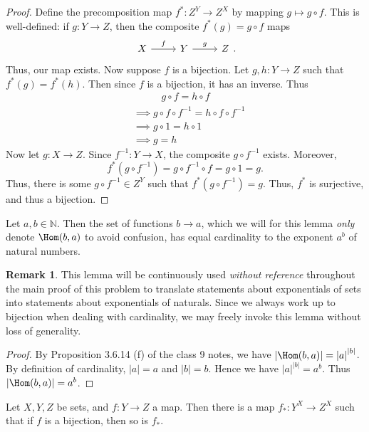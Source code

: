 \documentclass[11pt, letterpaper]{article}
\theoremstyle{definition}
\newtheorem*{remark*}{Remark}
\begin{document}
\begin{proof}
	Define the precomposition map $f^* : Z^Y \to Z^X$ by mapping $g\mapsto g\circ f$. This is well-defined: if $g : Y \to Z$, then the composite $f^*(g) = g\circ f$ maps
	\[
		\begin{tikzcd}[row sep = 2.5em, column sep = 2.5em]
		X \ar[" f ", r]  & Y \ar[" g ", r]  & Z
	\end{tikzcd}.
	\]
	Thus, our map exists. Now suppose $f$ is a bijection. Let $g,h : Y \to Z$ such that $f^*(g) = f^*(h)$. Then since $f$ is a bijection, it has an inverse. Thus
	\begin{align*}
		&\qquad\;\;\; g\circ f = h\circ f\\
		&\implies g\circ f\circ f^{-1} = h\circ f\circ f^{-1} \\
		&\implies g\circ 1 = h\circ 1\\
		&\implies g=h
	\end{align*}
	Now let $g : X \to Z$. Since $f^{-1} : Y \to X$, the composite $g\circ f^{-1} $ exists. Moreover,
	\[
		f^*(g\circ f^{-1} ) = g\circ f^{-1} \circ f = g\circ 1 = g
	.\]
	Thus, there is some $g\circ f^{-1} \in Z^Y$ such that $f^*(g\circ f^{-1} )=g$. Thus, $f^*$ is surjective, and thus a bijection.
\end{proof}
\begin{lemma}\label{lma:unreferenced}
	Let $a,b\in\mathbb{N} $. Then the set of functions $b\to a$, which we will for this lemma \emph{only} denote $\Hom(b,a)$ to avoid confusion, has equal cardinality to the exponent $a^b$ of natural numbers.
\end{lemma}
\begin{remark*}
	This lemma will be continuously used \emph{without reference} throughout the main proof of this problem to translate statements about exponentials of sets into statements about exponentials of naturals. Since we always work up to bijection when dealing with cardinality, we may freely invoke this lemma without loss of generality.
\end{remark*}
\begin{proof}
	By Proposition 3.6.14 (f) of the class 9 notes, we have $\left| \Hom(b,a) \right| =\left| a \right| ^{\left| b \right| } $. By definition of cardinality, $\left| a \right| =a$ and $\left| b \right| =b$. Hence we have $\left| a \right| ^{\left| b \right| } =a^b$. Thus $\left| \Hom(b,a) \right| =a^b$.
\end{proof}
\begin{lemma}\label{lma:unreferenced-2}
	Let $X,Y,Z$ be sets, and $f : Y \to Z$ a map. Then there is a map $f_* : Y^X \to Z^X$ such that if $f$ is a bijection, then so is $f_*$.
\end{lemma}
\end{document}
